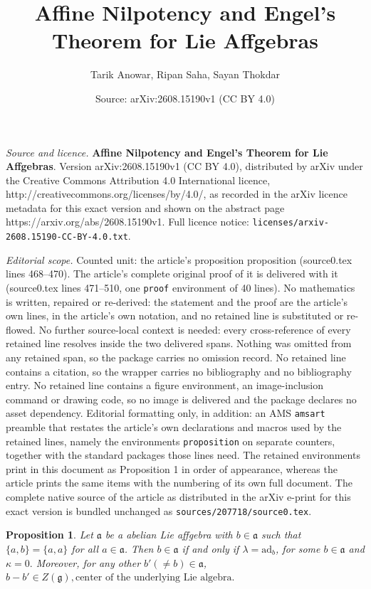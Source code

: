\documentclass[10pt,a4paper]{amsart}
\title{\textbf{Affine Nilpotency and Engel’s Theorem for Lie Affgebras}}
\author{Tarik Anowar, Ripan Saha, Sayan Thokdar}
\date{Source: arXiv:2608.15190v1 (CC BY 4.0)}
\newtheorem{proposition}{Proposition}
\begin{document}
\maketitle

\noindent\emph{Source and licence.} \textbf{Affine Nilpotency and Engel’s Theorem for Lie Affgebras}. Version arXiv:2608.15190v1 (CC BY 4.0), distributed by arXiv under the Creative Commons Attribution 4.0 International licence, http://creativecommons.org/licenses/by/4.0/, as recorded in the arXiv licence metadata for this exact version and shown on the abstract page https://arxiv.org/abs/2608.15190v1. Full licence notice: \texttt{licenses/arxiv-2608.15190-CC-BY-4.0.txt}.\par\smallskip

\noindent\textit{Editorial scope.} Counted unit: the article's proposition proposition (source0.tex lines 468--470). The article's complete original proof of it is delivered with it (source0.tex lines 471--510, one \texttt{proof} environment of 40 lines). No mathematics is written, repaired or re-derived: the statement and the proof are the article's own lines, in the article's own notation, and no retained line is substituted or re-flowed.  No further source-local context is needed: every cross-reference of every retained line resolves inside the two delivered spans.  Nothing was omitted from any retained span, so the package carries no omission record.  No retained line contains a citation, so the wrapper carries no bibliography and no bibliography entry.  No retained line contains a figure environment, an image-inclusion command or drawing code, so no image is delivered and the package declares no asset dependency.  Editorial formatting only, in addition: an AMS \texttt{amsart} preamble that restates the article's own declarations and macros used by the retained lines, namely the environments \texttt{proposition} on separate counters, together with the standard packages those lines need.  The retained environments print in this document as Proposition 1 in order of appearance, whereas the article prints the same items with the numbering of its own full document.  The complete native source of the article as distributed in the arXiv e-print for this exact version is bundled unchanged as \texttt{sources/207718/source0.tex}.
\begin{proposition}
   Let $\mathfrak{a}$ be a abelian Lie affgebra with $b\in \mathfrak{a}$ such that $\{a, b\}=\{a, a\}$ for all $a\in \mathfrak{a}$. Then $b\in \mathfrak{a}$ if and only if $\lambda=\text{ad}_b$, for some $b\in \mathfrak{a}$ and $\kappa=0.$ Moreover, for any other $b'(\neq b)\in \mathfrak{a}$, $b-b'\in Z(\mathfrak{g}), \text{center of the underlying Lie algebra}.$
\end{proposition}
\end{document}
